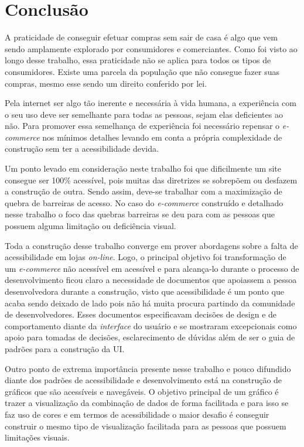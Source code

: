 \section{Conclusão}
\label{sec:conclusao}


{

A praticidade de conseguir efetuar compras sem sair de casa é algo que vem sendo amplamente explorado por consumidores e comerciantes. Como foi visto ao longo desse trabalho, essa praticidade não se aplica para todos os tipos de consumidores. Existe uma parcela da população que não consegue fazer suas compras, mesmo esse sendo um direito conferido por lei.

Pela internet ser algo tão inerente e necessária à vida humana, a experiência com o seu uso deve ser semelhante para todas as pessoas, sejam elas deficientes ao não. Para promover essa semelhança de experiência foi necessário repensar o \textit{e-commerce}
nos mínimos detalhes levando em conta a própria complexidade de construção sem ter a acessibilidade devida.

Um ponto levado em consideração neste trabalho foi que dificilmente um site consegue ser 100\% acessível, pois muitas das diretrizes se sobrepõem ou desfazem a construção de outra. Sendo assim, deve-se trabalhar com a maximização de quebra de barreiras de acesso. No caso do \textit{e-commerce} construído e detalhado nesse trabalho o foco das quebras barreiras se deu para com as pessoas que possuem alguma limitação ou deficiência visual. 

Toda a construção desse trabalho converge em prover abordagens sobre a falta de acessibilidade em lojas \textit{on-line}. Logo, o principal objetivo foi transformação de um \textit{e-commerce} não acessível em acessível e para alcança-lo durante o processo de desenvolvimento ficou claro a necessidade de documentos que apoiassem a pessoa desenvolvedora durante a construção, visto que acessibilidade é um ponto que acaba sendo deixado de lado pois não há muita procura partindo da comunidade de desenvolvedores. Esses documentos especificavam decisões de design e de comportamento diante da \textit{interface} do usuário e se mostraram excepcionais como apoio para tomadas de decisões, esclarecimento de dúvidas além de ser o guia de padrões para a construção da UI.

Outro ponto de extrema importância presente nesse trabalho e pouco difundido diante dos padrões de acessibilidade e desenvolvimento está na construção de gráficos que são acessíveis e navegáveis. O objetivo principal de um gráfico é trazer a visualização da combinação de dados de forma facilitada e para isso se faz uso de cores e em termos de acessibilidade o maior desafio é conseguir construir o mesmo tipo de visualização facilitada para as pessoas que possuem limitações visuais. 

}
